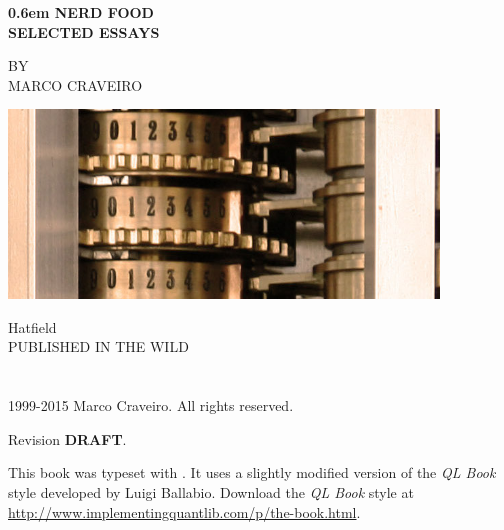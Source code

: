 \documentclass{book}
\begin{document}
\clearpage

\newcommand\nbvspace[1][3]{\vspace*{\stretch{#1}}}
\newcommand\nbstretchyspace{\spaceskip0.5em plus 0.25em minus 0.25em}
\newcommand{\nbtitlestretch}{\spaceskip0.6em}
\pagestyle{empty}
\begin{center}
\bfseries
\nbvspace[1]
\Huge
{\nbtitlestretch\huge
  NERD FOOD\\SELECTED ESSAYS}

\nbvspace[1]
\normalsize

\nbvspace[1]
\small BY\\
\Large MARCO CRAVEIRO\\[0.5em]

\nbvspace[2]

\begin{center}
  \includegraphics[width=4.5in]{difference_engine_cogs}
\end{center}
\nbvspace[3]
\normalsize

Hatfield\\
\large
PUBLISHED IN THE WILD
\nbvspace[1]
\end{center}

%
%
\newpage
{}
\section*{}
\pagestyle{empty}
\vfill
\begingroup
\footnotesize
\parindent 0pt
\parskip \baselineskip

\textcopyright{} 1999-2015 Marco Craveiro. All rights reserved.

Revision \textbf{DRAFT}.

This book was typeset with \LaTeXe. It uses a slightly modified
version of the \textit{QL Book} style developed by Luigi Ballabio.
Download the \textit{QL Book} style at
\url{http://www.implementingquantlib.com/p/the-book.html}.
\end{document}
